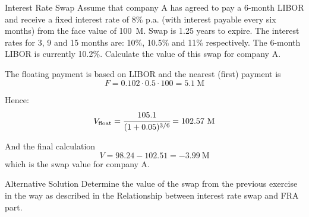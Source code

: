 \documentclass{beamer}
\begin{document}
\begin{frame}{}
\begin{block}{Interest Rate Swap}
Assume that company A has agreed to pay a 6-month LIBOR and receive a fixed interest rate of 8\% p.a. (with interest payable every six months) from the face value of 100~M. Swap is 1.25 years to expire. The interest rates for 3, 9 and 15 months are: 10\%, 10.5\% and 11\% respectively. The 6-month LIBOR is currently 10.2\%. Calculate the value of this swap for company A.
\end{block}
\end{frame}

\begin{frame}
The floating payment is based on LIBOR and the nearest (first) payment is 
\begin{equation*}
F = 0.102\cdot0.5\cdot 100 = 5.1~\text{M}
\end{equation*}

Hence:
\begin{equation*}
V_{\text{float}} = \cfrac{105.1}{(1+0.05)^{3/6}}= 102.57~\text{M}
\end{equation*}

And the final calculation
\begin{equation*}
V = 98.24-102.51=-3.99~\text{M}
\end{equation*}
which is the swap value for company A.
\end{frame}

\begin{frame}{}
\begin{block}{Alternative Solution}
Determine the value of the swap from the previous exercise in the way as described in the Relationship between interest rate swap and FRA part.
\end{block}
\end{frame}
\end{document}
